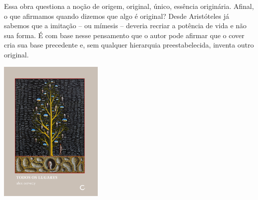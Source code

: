 \hspace*{-7cm}\hrulefill\hspace*{-7cm}

\medskip

\noindent{}Essa obra questiona a noção de origem, original, único, essência originária. Afinal, o que afirmamos quando dizemos que algo é original? Desde Aristóteles já sabemos que a imitação – ou mímesis – deveria recriar a potência de vida e não sua forma. É com base nesse pensamento que o autor pode afirmar que o cover cria {} sua base precedente e, sem qualquer hierarquia preestabelecida, inventa outro original.

\vfill

\hspace*{-.4cm}\begin{minipage}[c]{1\linewidth}
\small{
{}}
\end{minipage}

\pagebreak

\hspace{.5cm}

\begin{center}
\hspace*{-.5cm}\includegraphics[width=50mm]{./imgs/lugares.jpg}
\end{center}

\hspace*{-7cm}\hrulefill\hspace*{-7cm}

